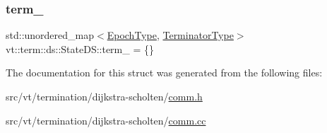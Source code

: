 \subsubsection{\texorpdfstring{term\+\_\+}{term\_}}
{\footnotesize\ttfamily std\+::unordered\+\_\+map$<$\hyperlink{namespacevt_a985a5adf291c34a3ca263b3378388236}{Epoch\+Type}, \hyperlink{structvt_1_1term_1_1ds_1_1_state_d_s_af98cfe31c25f710273ee103026d538e4}{Terminator\+Type}$>$ vt\+::term\+::ds\+::\+State\+D\+S\+::term\+\_\+ = \{\}\hspace{0.3cm}{\ttfamily [protected]}}



The documentation for this struct was generated from the following files\+:\begin{DoxyCompactItemize}
\item 
src/vt/termination/dijkstra-\/scholten/\hyperlink{comm_8h}{comm.\+h}\item 
src/vt/termination/dijkstra-\/scholten/\hyperlink{comm_8cc}{comm.\+cc}\end{DoxyCompactItemize}

